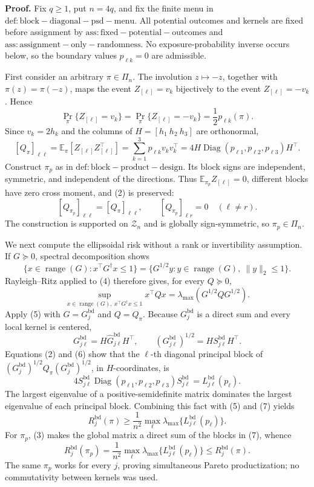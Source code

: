 \textbf{Proof.}
Fix \(q\ge1\), put \(n=4q\), and fix the finite menu in \(\mathrm{def:block-diagonal-psd-menu}\).  All potential outcomes and kernels are fixed before assignment by \(\mathrm{ass:fixed-potential-outcomes}\) and \(\mathrm{ass:assignment-only-randomness}\).  No exposure-probability inverse occurs below, so the boundary values \(p_{\ell k}=0\) are admissible.

First consider an arbitrary \(\pi\in\Pi_n\).  The involution \(z\mapsto-z\), together with \(\pi(z)=\pi(-z)\), maps the event \(Z_{[\ell]}=v_k\) bijectively to the event \(Z_{[\ell]}=-v_k\).  Hence
\[
\Pr_\pi\{Z_{[\ell]}=v_k\}
=\Pr_\pi\{Z_{[\ell]}=-v_k\}
=\frac12p_{\ell k}(\pi). \tag{1}
\]
Since \(v_k=2h_k\) and the columns of \(H=[h_1\ h_2\ h_3]\) are orthonormal,
\[
[Q_\pi]_{\ell\ell}
=\mathbb E_\pi[Z_{[\ell]}Z_{[\ell]}^\top]
=\sum_{k=1}^3p_{\ell k}v_kv_k^\top
=4H\operatorname{Diag}(p_{\ell1},p_{\ell2},p_{\ell3})H^\top. \tag{2}
\]
Construct \(\pi_p\) as in \(\mathrm{def:block-product-design}\).  Its block signs are independent, symmetric, and independent of the directions.  Thus \(\mathbb E_{\pi_p}Z_{[\ell]}=0\), different blocks have zero cross moment, and (2) is preserved:
\[
[Q_{\pi_p}]_{\ell\ell}=[Q_\pi]_{\ell\ell},
\qquad [Q_{\pi_p}]_{\ell r}=0\quad(\ell\ne r). \tag{3}
\]
The construction is supported on \(\mathcal Z_n\) and is globally sign-symmetric, so \(\pi_p\in\Pi_n\).

We next compute the ellipsoidal risk without a rank or invertibility assumption.  If \(G\succeq0\), spectral decomposition shows
\[
\{x\in\operatorname{range}(G):x^\top G^\dagger x\le1\}
=\{G^{1/2}y:y\in\operatorname{range}(G),\ \|y\|_2\le1\}. \tag{4}
\]
Rayleigh--Ritz applied to (4) therefore gives, for every \(Q\succeq0\),
\[
\sup_{x\in\operatorname{range}(G),\ x^\top G^\dagger x\le1}x^\top Qx
=\lambda_{\max}(G^{1/2}QG^{1/2}). \tag{5}
\]
Apply (5) with \(G=G_j^{\mathrm{bd}}\) and \(Q=Q_\pi\).  Because \(G_j^{\mathrm{bd}}\) is a direct sum and every local kernel is centered,
\[
G_{j\ell}^{\mathrm{bd}}=H\widehat G_{j\ell}^{\mathrm{bd}}H^\top,
\qquad
(G_{j\ell}^{\mathrm{bd}})^{1/2}=HS_{j\ell}^{\mathrm{bd}}H^\top. \tag{6}
\]
Equations (2) and (6) show that the \(\ell\)-th diagonal principal block of
\((G_j^{\mathrm{bd}})^{1/2}Q_\pi(G_j^{\mathrm{bd}})^{1/2}\), in \(H\)-coordinates, is
\[
4S_{j\ell}^{\mathrm{bd}}
\operatorname{Diag}(p_{\ell1},p_{\ell2},p_{\ell3})
S_{j\ell}^{\mathrm{bd}}
=L_{j\ell}^{\mathrm{bd}}(p_\ell). \tag{7}
\]
The largest eigenvalue of a positive-semidefinite matrix dominates the largest eigenvalue of each principal block.  Combining this fact with (5) and (7) yields
\[
R_j^{\mathrm{bd}}(\pi)
\ge \frac1{n^2}\max_\ell
\lambda_{\max}\{L_{j\ell}^{\mathrm{bd}}(p_\ell)\}. \tag{8}
\]
For \(\pi_p\), (3) makes the global matrix a direct sum of the blocks in (7), whence
\[
R_j^{\mathrm{bd}}(\pi_p)
=\frac1{n^2}\max_\ell
\lambda_{\max}\{L_{j\ell}^{\mathrm{bd}}(p_\ell)\}
\le R_j^{\mathrm{bd}}(\pi). \tag{9}
\]
The same \(\pi_p\) works for every \(j\), proving simultaneous Pareto productization; no commutativity between kernels was used.


